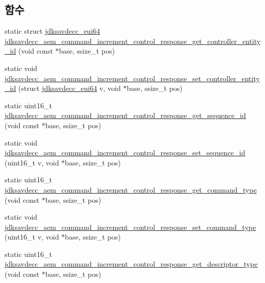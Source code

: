\subsection*{함수}
\begin{DoxyCompactItemize}
\item 
static struct \hyperlink{structjdksavdecc__eui64}{jdksavdecc\+\_\+eui64} \hyperlink{group__command__increment__control__response_ga995960be4afd504784f33c2cf598cbd2}{jdksavdecc\+\_\+aem\+\_\+command\+\_\+increment\+\_\+control\+\_\+response\+\_\+get\+\_\+controller\+\_\+entity\+\_\+id} (void const $\ast$base, ssize\+\_\+t pos)
\item 
static void \hyperlink{group__command__increment__control__response_ga67317d829444b76e40286cc46bee57ca}{jdksavdecc\+\_\+aem\+\_\+command\+\_\+increment\+\_\+control\+\_\+response\+\_\+set\+\_\+controller\+\_\+entity\+\_\+id} (struct \hyperlink{structjdksavdecc__eui64}{jdksavdecc\+\_\+eui64} v, void $\ast$base, ssize\+\_\+t pos)
\item 
static uint16\+\_\+t \hyperlink{group__command__increment__control__response_ga00f22b00ce9840da91724f8515e27f72}{jdksavdecc\+\_\+aem\+\_\+command\+\_\+increment\+\_\+control\+\_\+response\+\_\+get\+\_\+sequence\+\_\+id} (void const $\ast$base, ssize\+\_\+t pos)
\item 
static void \hyperlink{group__command__increment__control__response_ga226b65005c593b36840db024e3ee3151}{jdksavdecc\+\_\+aem\+\_\+command\+\_\+increment\+\_\+control\+\_\+response\+\_\+set\+\_\+sequence\+\_\+id} (uint16\+\_\+t v, void $\ast$base, ssize\+\_\+t pos)
\item 
static uint16\+\_\+t \hyperlink{group__command__increment__control__response_gae6340b2435f2a060316974c99ed53320}{jdksavdecc\+\_\+aem\+\_\+command\+\_\+increment\+\_\+control\+\_\+response\+\_\+get\+\_\+command\+\_\+type} (void const $\ast$base, ssize\+\_\+t pos)
\item 
static void \hyperlink{group__command__increment__control__response_gaa621445a3a53b193a0f6eaefc77c999c}{jdksavdecc\+\_\+aem\+\_\+command\+\_\+increment\+\_\+control\+\_\+response\+\_\+set\+\_\+command\+\_\+type} (uint16\+\_\+t v, void $\ast$base, ssize\+\_\+t pos)
\item 
static uint16\+\_\+t \hyperlink{group__command__increment__control__response_ga5e8527c2b1dd2532915b82c65b35b93d}{jdksavdecc\+\_\+aem\+\_\+command\+\_\+increment\+\_\+control\+\_\+response\+\_\+get\+\_\+descriptor\+\_\+type} (void const $\ast$base, ssize\+\_\+t pos)
\item 

\end{DoxyCompactItemize}
